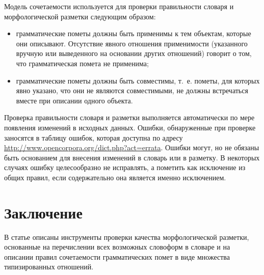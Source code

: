 \documentclass[a4paper]{article}
\begin{document}
Модель сочетаемости используется для проверки правильности словаря и морфологической разметки следующим образом:
\begin{itemize}
\item грамматические пометы должны быть применимы к тем объектам, которые они описывают. Отсутствие явного отношения применимости (указанного вручную или выведенного на основании других отношений) говорит о том, что грамматическая помета не применима;
\item грамматические пометы должны быть совместимы, т.~е. пометы, для которых явно указано, что они не являются совместимыми, не должны встречаться вместе при описании одного объекта.
\end{itemize}

Проверка правильности словаря и разметки выполняется автоматически по мере появления изменений в исходных данных. Ошибки, обнаруженные при проверке заносятся в таблицу ошибок, которая доступна по адресу \url{http://www.opencorpora.org/dict.php?act=errata}. Ошибки могут, но не обязаны быть основанием для внесения изменений в словарь или в разметку. В некоторых случаях ошибку целесообразно не исправлять, а пометить как исключение из общих правил, если содержательно она является именно исключением.

\section{Заключение}
В статье описаны инструменты проверки качества морфологической разметки, основанные на перечислении всех возможных словоформ в словаре и на описании правил сочетаемости грамматических помет в виде множества типизированных отношений.


\end{document}

